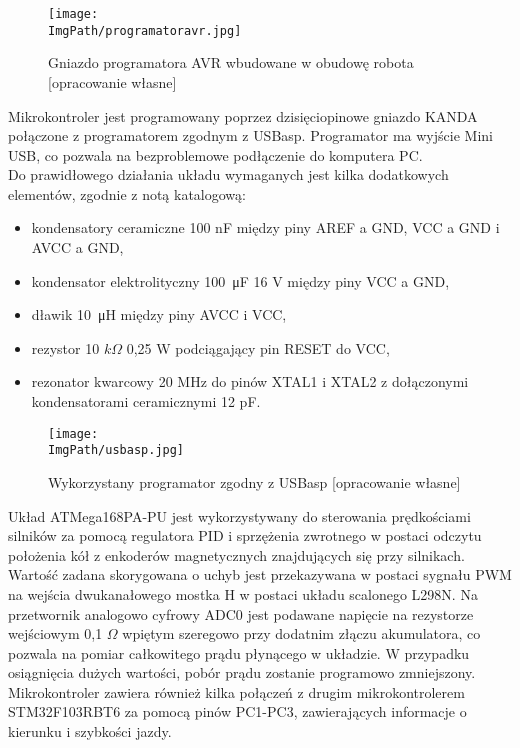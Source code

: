 \documentclass[a4paper,12pt,twoside,openany]{report}
\newcommand{\ImgPath}{.}
\begin{document}
\begin{figure}[!htbp]
	\begin{center}
\centering
\texttt{[image: \\ImgPath/programatoravr.jpg]}
\end{center}
	\caption{Gniazdo programatora AVR wbudowane w obudowę robota [opracowanie własne]}
	\label{schematKomunikacji}
\end{figure}

\newpage

Mikrokontroler jest programowany poprzez dzisięciopinowe gniazdo KANDA połączone z programatorem zgodnym z USBasp. Programator ma wyjście Mini USB, co pozwala na bezproblemowe podłączenie do komputera PC.\\
Do prawidłowego działania układu wymaganych jest kilka dodatkowych elementów, zgodnie z notą katalogową:
\begin{itemize}
\item kondensatory ceramiczne 100 nF między piny AREF a GND, VCC a GND i AVCC a GND,
\item kondensator elektrolityczny \SI{100}{\micro F} 16 V między piny VCC a GND,
\item dławik \SI{10}{\micro H} między piny AVCC i VCC,
\item rezystor 10 $k\Omega$ 0,25 W podciągający pin RESET do VCC,
\item rezonator kwarcowy 20 MHz do pinów XTAL1 i XTAL2 z dołączonymi kondensatorami ceramicznymi 12 pF.
\end{itemize}

\newpage

\begin{figure}[!htbp]
	\begin{center}
\centering
\texttt{[image: \\ImgPath/usbasp.jpg]}
\end{center}
	\caption{Wykorzystany programator zgodny z USBasp [opracowanie własne]}
	\label{schematKomunikacji}
\end{figure}

Układ ATMega168PA-PU jest wykorzystywany do sterowania prędkościami silników za pomocą regulatora PID i sprzężenia zwrotnego w postaci odczytu położenia kół z enkoderów magnetycznych znajdujących się przy silnikach. Wartość zadana skorygowana o uchyb jest przekazywana w postaci sygnału PWM na wejścia dwukanałowego mostka H w postaci układu scalonego L298N. Na przetwornik analogowo cyfrowy ADC0 jest podawane napięcie na rezystorze wejściowym 0,1 $\Omega$ wpiętym szeregowo przy dodatnim złączu akumulatora, co pozwala na pomiar całkowitego prądu płynącego w układzie. W przypadku osiągnięcia dużych wartości, pobór prądu zostanie programowo zmniejszony. Mikrokontroler zawiera również kilka połączeń z drugim mikrokontrolerem STM32F103RBT6 za pomocą pinów PC1-PC3, zawierających informacje o kierunku i szybkości jazdy.
\end{document}
